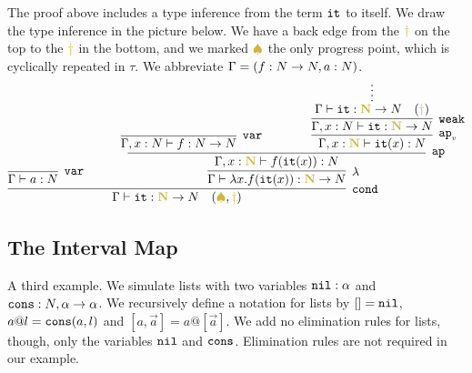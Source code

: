 The proof above includes a type inference from the term ${\tt it}$ to itself.
We draw the type inference in the picture below. 
We have a back edge from the 
$\bfColor{oldgold}{\dagger}$ on the top to the $\bfColor{oldgold}{\dagger}$ in the bottom,
and we marked $\bfColor{oldgold}{ \spadesuit}$ the only progress point, which is cyclically repeated
in $\tau$.
We abbreviate $\Gamma = (f:{N} \rightarrow {N}, a:{N})$.
\[
{
    \infer[\cond]{ %
      \Gamma 
      \vdash \iter: \bfColor{oldgold}{\N} \rightarrow \N 
        \quad (\bfColor{oldgold}{ \spadesuit}, \bfColor{oldgold}{\dagger})
     }{ 
         \infer[\var]{
       \Gamma 
      \vdash a:\N}{}
     &
        {\ \ \ \ \ \ }
        {\infer[\lambda] %
         {
         \Gamma
          \vdash \lambda x.f(\iter(x)):\bfColor{oldgold}{\N} \rightarrow \N
         }{
         \infer[\ap]{ %
           \Gamma, x:\bfColor{oldgold}{\N}
          \vdash f(\iter(x)):\N
           }{
          \infer[\var]{
       \Gamma, x:\N 
      \vdash f:\N \rightarrow \N}{}
           {\ \ \ \ \ \ \ \ \ \ \ \ }
           {\infer[\apvar] %
            {\Gamma, x:\bfColor{oldgold}{\N}
        \vdash \iter(x): \N 
             }{
          \infer[\weak]{\Gamma, x:\N
                                 \vdash \iter: \bfColor{oldgold}{\N} \rightarrow \N}
                                {\infer*{\Gamma
                                 \vdash \iter: \bfColor{oldgold}{\N} \rightarrow \N
                                  \ \ \ (\bfColor{oldgold}{ \dagger})}{}
             }
           }
          }
        }%
      }%
    }%
   }%
 }%
\]




\subsection{The Interval Map}
A third example. We simulate lists with two variables ${\tt nil}:\alpha$ and 
${\tt cons}:{N},\alpha \rightarrow \alpha$. We recursively define a notation for lists by $[]={\tt nil}$,
$a @ l={\tt cons}(a,l)$ and $[a,\vec{a}] = a @ [\vec{a}]$. We add no elimination rules for lists, though,
only the variables ${\tt nil}$ and ${\tt cons}$. Elimination rules are not required in our example.

